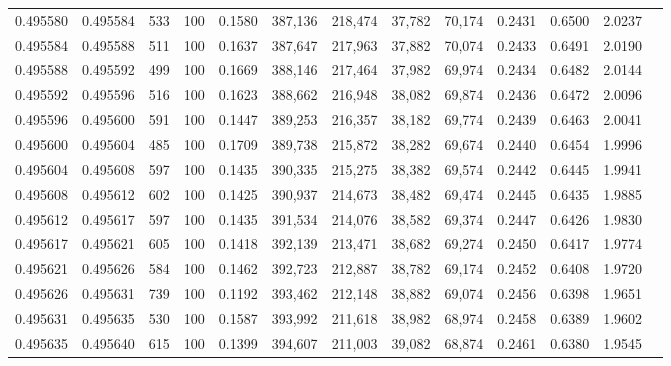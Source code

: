 \begin{tabular}{rrrrrrrrrrrrr}
0.495580 & 0.495584 &   533 & 100 &                                     0.1580 & 387,136 & 218,474 &  37,782 &  70,174 & 0.2431 & 0.6500 & 2.0237 \\
0.495584 & 0.495588 &   511 & 100 &                                     0.1637 & 387,647 & 217,963 &  37,882 &  70,074 & 0.2433 & 0.6491 & 2.0190 \\
0.495588 & 0.495592 &   499 & 100 &                                     0.1669 & 388,146 & 217,464 &  37,982 &  69,974 & 0.2434 & 0.6482 & 2.0144 \\
0.495592 & 0.495596 &   516 & 100 &                                     0.1623 & 388,662 & 216,948 &  38,082 &  69,874 & 0.2436 & 0.6472 & 2.0096 \\
0.495596 & 0.495600 &   591 & 100 &                                     0.1447 & 389,253 & 216,357 &  38,182 &  69,774 & 0.2439 & 0.6463 & 2.0041 \\
0.495600 & 0.495604 &   485 & 100 &                                     0.1709 & 389,738 & 215,872 &  38,282 &  69,674 & 0.2440 & 0.6454 & 1.9996 \\
0.495604 & 0.495608 &   597 & 100 &                                     0.1435 & 390,335 & 215,275 &  38,382 &  69,574 & 0.2442 & 0.6445 & 1.9941 \\
0.495608 & 0.495612 &   602 & 100 &                                     0.1425 & 390,937 & 214,673 &  38,482 &  69,474 & 0.2445 & 0.6435 & 1.9885 \\
0.495612 & 0.495617 &   597 & 100 &                                     0.1435 & 391,534 & 214,076 &  38,582 &  69,374 & 0.2447 & 0.6426 & 1.9830 \\
0.495617 & 0.495621 &   605 & 100 &                                     0.1418 & 392,139 & 213,471 &  38,682 &  69,274 & 0.2450 & 0.6417 & 1.9774 \\
0.495621 & 0.495626 &   584 & 100 &                                     0.1462 & 392,723 & 212,887 &  38,782 &  69,174 & 0.2452 & 0.6408 & 1.9720 \\
0.495626 & 0.495631 &   739 & 100 &                                     0.1192 & 393,462 & 212,148 &  38,882 &  69,074 & 0.2456 & 0.6398 & 1.9651 \\
0.495631 & 0.495635 &   530 & 100 &                                     0.1587 & 393,992 & 211,618 &  38,982 &  68,974 & 0.2458 & 0.6389 & 1.9602 \\
0.495635 & 0.495640 &   615 & 100 &                                     0.1399 & 394,607 & 211,003 &  39,082 &  68,874 & 0.2461 & 0.6380 & 1.9545 \\

\end{tabular}
